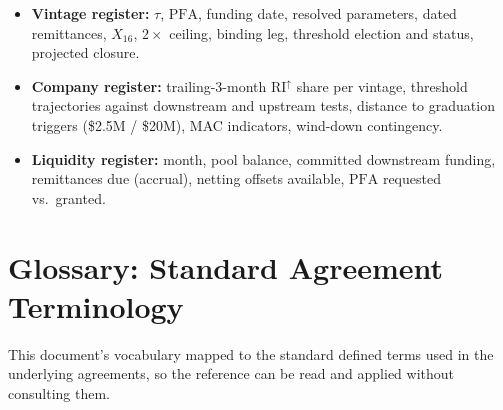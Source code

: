 \documentclass[11pt, a4paper]{article}
\theoremstyle{definition}
\newcommand{\PFA}{\mathrm{PFA}}                   %
\newcommand{\RIup}{\mathrm{RI}^{\uparrow}}        %
\newcommand{\Xirr}{X_{16}}                        %
\begin{document}
\begin{itemize}
    \item \textbf{Vintage register:} $\tau$, $\PFA$, funding date, resolved parameters, dated remittances, $\Xirr$, $2\times$ ceiling, binding leg, threshold election and status, projected closure.
    \item \textbf{Company register:} trailing-3-month $\RIup$ share per vintage, threshold trajectories against downstream and upstream tests, distance to graduation triggers (\$2.5M / \$20M), MAC indicators, wind-down contingency.
    \item \textbf{Liquidity register:} month, pool balance, committed downstream funding, remittances due (accrual), netting offsets available, $\PFA$ requested vs.\ granted.
\end{itemize}

\appendix
\section{Glossary: Standard Agreement Terminology}\label{sec:xval}

This document's vocabulary mapped to the standard defined terms used in the underlying agreements, so the reference can be read and applied without consulting them.
\end{document}
